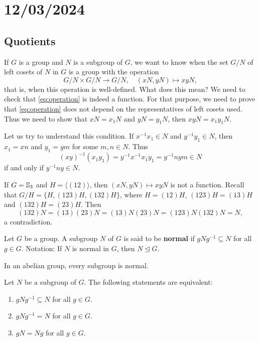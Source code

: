 \section{12/03/2024}

\subsection{Quotients}

If $G$ is a group and $N$ is a subgroup of $G$, we want to know
when the set $G/N$ of left cosets 
of $N$ in $G$ is a group with 
the operation 
\begin{equation}
\label{eq:operation}
G/N\times G/N\to G/N,\quad 
(xN,yN)\mapsto xyN,
\end{equation}
that is, when this operation 
is well-defined. 
What does this mean? We need to check that
\eqref{eq:operation} is indeed a function. 
For that purpose, we need to prove that
\eqref{eq:operation} does not depend on the representatives of left
cosets used. Thus we need to show that 
$xN=x_1N$ and $yN=y_1N$, then 
$xyN=x_1y_1N$. 

Let us try to understand this condition. If $x^{-1}x_1\in N$ and 
$y^{-1}y_1\in N$, then $x_1=xn$ and $y_1=ym$ for some 
$m,n\in N$. Thus 
\[
(xy)^{-1}(x_1y_1)=y^{-1}x^{-1}x_1y_1=y^{-1}nym\in N
\]
if and only if $y^{-1}ny\in N$.

\begin{example}
If $G=\mathbb{S}_3$ and $H=\langle (12)\rangle$, then $(xN,yN)\mapsto xyN$ is not a function. Recall that 
$G/H=\{H,(123)H,(132)H\}$, where 
$H=(12)H$, $(123)H=(13)H$ and $(132)H=(23)H$. Then 
\[
(132)N=(13)(23)N=(13)N(23)N=(123)N(132)N=N,
\]
a contradiction.
\end{example}

\begin{definition}
    Let $G$ be a group. 
    A subgroup $N$ of $G$ is said to be \textbf{normal} if $gNg^{-1}\subseteq N$ for all $g\in G$.
    Notation: If $N$ is normal in $G$, then $N\unlhd G$.
\end{definition}

In an abelian group, every subgroup is normal. 

\begin{proposition}
\label{pro:normalidad}
Let $N$ be a subgroup of $G$. 
The following statements are equivalent:
\begin{enumerate}
        \item $gNg^{-1}\subseteq N$ for all $g\in G$.
        \item $gNg^{-1}=N$ for all $g\in G$.
        \item $gN=Ng$ for all $g\in G$.
\end{enumerate}
\end{proposition}

